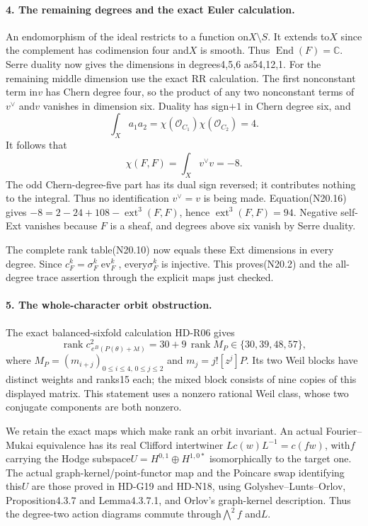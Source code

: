\paragraph{4. The remaining degrees and the exact Euler calculation.}
An endomorphism of the ideal restricts to a function on$X\setminus S$.
It extends to$X$ since the complement has codimension four and$X$
is smooth. Thus $\operatorname{End}(F)=\mathbb C$.
Serre duality now gives the dimensions in degrees4,5,6 as54,12,1.
For the remaining middle dimension use the exact RR calculation.
The first nonconstant term in$v$ has Chern degree four, so
the product of any two nonconstant terms of$v^\vee$ and$v$
vanishes in dimension six. Duality has sign$+1$ in Chern
degree six, and
\[
 \int_Xa_1a_2=\chi(\mathcal O_{C_1})\chi(\mathcal O_{C_2})=4.
\]
It follows that
\[
                   \chi(F,F)=\int_Xv^\vee v=-8.               \tag{N20.16}
\]
The odd Chern-degree-five part has its dual sign reversed;
it contributes nothing to the integral. Thus no identification
$v^\vee=v$ is being made.
Equation(N20.16) gives
$-8=2-24+108-\operatorname{ext}^3(F,F)$, hence
$\operatorname{ext}^3(F,F)=94$. Negative self-Ext vanishes because
$F$ is a sheaf, and degrees above six vanish by Serre duality.

The complete rank table(N20.10) now equals these Ext dimensions
in every degree. Since $c_F^k=\sigma_F^k\operatorname{ev}_F^k$,
every$\sigma_F^k$ is injective. This proves(N20.2) and the
all-degree trace assertion through the explicit maps just checked.

\paragraph{5. The whole-character orbit obstruction.}
The exact balanced-sixfold calculation HD-R06 gives
\[
 \operatorname{rank}c^2_{\,e^B(P(\theta)+\lambda t)}
       =30+9\,\operatorname{rank}M_P
                     \in\{30,39,48,57\},                       \tag{N20.17}
\]
where $M_P=(m_{i+j})_{0\le i\le4,\,0\le j\le2}$ and
$m_j=j![z^j]P$. Its two Weil blocks have distinct weights
and ranks15 each; the mixed block consists of nine copies
of this displayed matrix. This statement uses a nonzero
rational Weil class, whose two conjugate components are
both nonzero.

We retain the exact maps which make rank an orbit invariant.
An actual Fourier--Mukai equivalence has its real Clifford
intertwiner $L c(w)L^{-1}=c(fw)$, with$f$ carrying the Hodge
subspace$U=H^{0,1}\oplus H^{1,0*}$ isomorphically to the
target one. The actual graph-kernel/point-functor map and the
Poincare swap identifying this$U$ are those proved in
HD-G19 and HD-N18, using Golyshev--Lunts--Orlov,
Proposition4.3.7 and Lemma4.3.7.1, and Orlov's graph-kernel
description. Thus the degree-two action diagrams commute
through$\bigwedge^2f$ and$L$.

